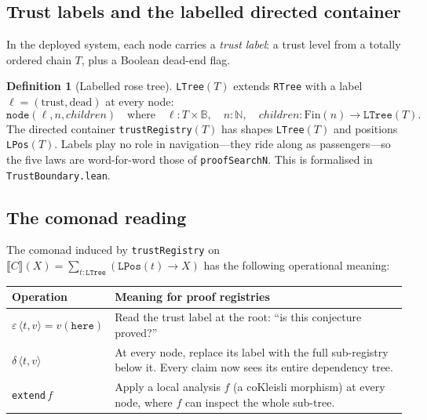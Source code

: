 \documentclass[11pt,a4paper]{article}
\theoremstyle{definition}
\newtheorem{definition}{Definition}[section]
\theoremstyle{plain}
\theoremstyle{remark}
\begin{document}
\subsection{Trust labels and the labelled directed container}

In the deployed system, each node carries a \emph{trust label}: a
trust level from a totally ordered chain $T$, plus a Boolean dead-end
flag.

\begin{definition}[Labelled rose tree]
\texttt{LTree}$(T)$ extends \texttt{RTree} with a label
$\ell = (\mathrm{trust}, \mathrm{dead})$ at every node:
\[
  \texttt{node}(\ell, n, \mathit{children}) \quad\text{where}\quad
  \ell : T \times \mathbb{B},\quad
  n : \mathbb{N},\quad
  \mathit{children} : \mathrm{Fin}(n) \to \texttt{LTree}(T).
\]
The directed container \texttt{trustRegistry}$(T)$ has shapes
\texttt{LTree}$(T)$ and positions \texttt{LPos}$(T)$. Labels play no
role in navigation---they ride along as passengers---so the five laws
are word-for-word those of \texttt{proofSearchN}. This is formalised
in \texttt{TrustBoundary.lean}.
\end{definition}

\subsection{The comonad reading}

The comonad induced by \texttt{trustRegistry} on
$\llbracket C \rrbracket(X) = \sum_{t : \texttt{LTree}} (\texttt{LPos}(t) \to X)$
has the following operational meaning:

\begin{center}
\begin{tabular}{lp{9cm}}
\toprule
\textbf{Operation} & \textbf{Meaning for proof registries} \\
\midrule
$\varepsilon\,\langle t, v \rangle = v(\texttt{here})$
  & Read the trust label at the root: ``is this conjecture proved?'' \\
$\delta\,\langle t, v \rangle$
  & At every node, replace its label with the full sub-registry below
    it. Every claim now sees its entire dependency tree. \\
\texttt{extend}\,$f$
  & Apply a local analysis $f$ (a coKleisli morphism) at every node,
    where $f$ can inspect the whole sub-tree. \\
\bottomrule
\end{tabular}
\end{center}
\end{document}
